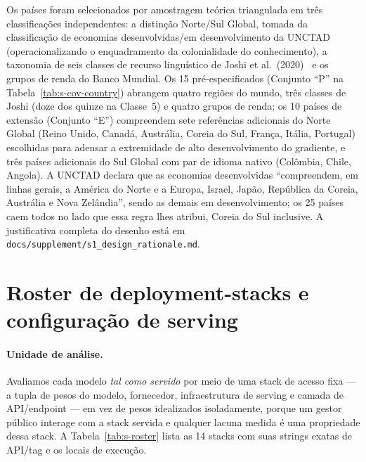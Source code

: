 \documentclass[11pt,a4paper]{article}
\begin{document}
Os países foram selecionados por amostragem teórica triangulada em três
classificações independentes: a distinção Norte/Sul Global, tomada da classificação
de economias desenvolvidas/em desenvolvimento da UNCTAD
(operacionalizando o enquadramento da colonialidade do conhecimento), a taxonomia
de seis classes de recurso linguístico de Joshi et al.\ (2020)~\citep{joshi2020state}
e os grupos de renda do Banco Mundial. Os 15 pré-especificados (Conjunto ``P'' na
Tabela~\ref{tab:s-cov-country}) abrangem quatro regiões do mundo, três classes de
Joshi (doze dos quinze na Classe~5) e quatro grupos de renda; os 10 países de extensão (Conjunto ``E'')
compreendem sete referências adicionais do Norte Global (Reino Unido, Canadá,
Austrália, Coreia do Sul, França, Itália, Portugal) escolhidas para adensar a
extremidade de alto desenvolvimento do gradiente, e três países adicionais do Sul
Global com par de idioma nativo (Colômbia, Chile, Angola). A UNCTAD declara que as
economias desenvolvidas ``compreendem, em linhas gerais, a América do Norte e a
Europa, Israel, Japão, República da Coreia, Austrália e Nova Zelândia'', sendo as
demais em desenvolvimento; os 25 países caem todos no lado que essa regra lhes
atribui, Coreia do Sul inclusive. A justificativa completa do desenho está em
\texttt{docs/supplement/s1\_design\_rationale.md}.

\section{Roster de deployment-stacks e configuração de serving}

\paragraph{Unidade de análise.} Avaliamos cada modelo \emph{tal como servido} por
meio de uma stack de acesso fixa --- a tupla de pesos do modelo, fornecedor,
infraestrutura de serving e camada de API/endpoint --- em vez de pesos idealizados
isoladamente, porque um gestor público interage com a stack servida e qualquer
lacuna medida é uma propriedade dessa stack. A Tabela~\ref{tab:s-roster} lista as
14 stacks com suas strings exatas de API/tag e os locais de execução.


\end{document}

